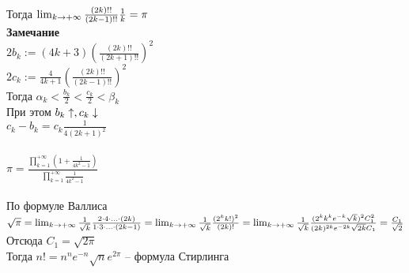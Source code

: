 \documentclass[12pt]{article}
\begin{document}
Тогда $\lim_{k\rightarrow +\infty} \frac{(2k)!!}{(2k-1)!!}\frac1k = \pi$\\
\textbf{Замечание}\\
$2b_k:= (4k+3)(\frac{(2k)!!}{(2k+1)!!})^2$\\
$2c_k:= \frac4{4k+1}(\frac{(2k)!!}{(2k-1)!!})^2$\\
Тогда $\alpha_k < \frac{b_k}2 < \frac{c_k}2 < \beta_k$\\
При этом $b_k \uparrow, c_k \downarrow$\\
$c_k - b_k = c_k \frac1{4(2k+1)^2}$\\\\
$\pi = \frac{\prod_{k=1}^{+\infty} (1 + \frac1{4k^2-1})}{\prod_{k=1}^{+\infty} \frac1{4k^2-1}}$\\\\
По формуле Валлиса $\sqrt \pi = \lim_{k\rightarrow + \infty} \frac1{\sqrt k}\frac{2\cdot 4 \cdot \ldots \cdot (2k)}{1\cdot 3 \cdot \ldots \cdot (2k-1)} = \lim_{k\rightarrow + \infty} \frac1{\sqrt k} \frac{(2^k k!)^2}{(2k)!} = \lim_{k\rightarrow +\infty} \frac1{\sqrt k} \frac{(2^k k^k e^{-k}\sqrt{k})^2 C_1^2}{(2k)^{2k}e^{-2k}\sqrt {2k}C_1} = \frac{C_1}{\sqrt{2}}$\\
Отсюда $C_1 =\sqrt{2\pi}$\\
Тогда $n! = n^n e^{-n}\sqrt n e^{2\pi}$ -- формула Стирлинга\\
\end{document}
